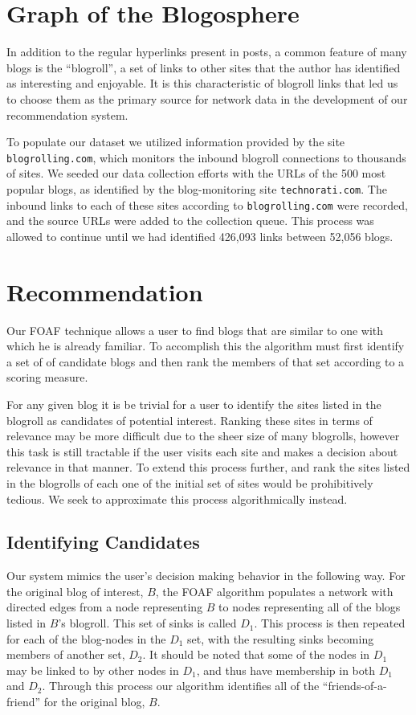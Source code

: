 \documentclass{sig-alternate}
\begin{document}
\section{Graph of the Blogosphere}
In addition to the regular hyperlinks present in posts, a common
feature of many blogs is the ``blogroll'', a set of
links to other sites that the author has identified as interesting and
enjoyable.  It is this characteristic of blogroll links
that led us to choose them as the primary source for network data in
the development of our recommendation system.

To populate our dataset we utilized information provided by the site
\texttt{blogrolling.com}, which monitors the inbound blogroll
connections to thousands of sites.  We seeded our data collection
efforts with the URLs of the 500 most popular blogs, as identified by
the blog-monitoring site \texttt{technorati.com}.  The inbound links to each of
these sites according to \texttt{blogrolling.com} were recorded, and the source
URLs were added to the collection queue.  This process was allowed to
continue until we had identified 426,093 links between 52,056 blogs.

\section{Recommendation}
Our FOAF technique allows a user to find blogs that are similar to one
with which he is already familiar.  To accomplish this the algorithm
must first identify a set of of candidate blogs and then rank the
members of that set according to a scoring measure.

For any given blog it is be trivial for a user to identify the sites
listed in the blogroll as candidates of potential interest.  Ranking
these sites in terms of relevance may be more difficult due to the
sheer size of many blogrolls, however this task is still tractable if
the user visits each site and makes a decision about relevance in that
manner.  To extend this process further, and rank the sites listed in
the blogrolls of each one of the initial set of sites would be
prohibitively tedious.  We seek to approximate this process
algorithmically instead.

\subsection{Identifying Candidates}
Our system mimics the user's decision making behavior in the following
way.  For the original blog of interest, $B$, the FOAF algorithm
populates a network with directed edges from a node representing $B$ to
nodes representing all of the blogs listed in $B$'s blogroll.  This set
of sinks is called $D_1$.  This process is then repeated for each of the
blog-nodes in the $D_1$ set, with the resulting sinks becoming members
of another set, $D_2$.  It should be noted that some of the nodes in $D_1$
may be linked to by other nodes in $D_1$, and thus have membership in
both $D_1$ and $D_2$.  Through this process our algorithm identifies all of
the ``friends-of-a-friend'' for the original blog, $B$.
\end{document}

